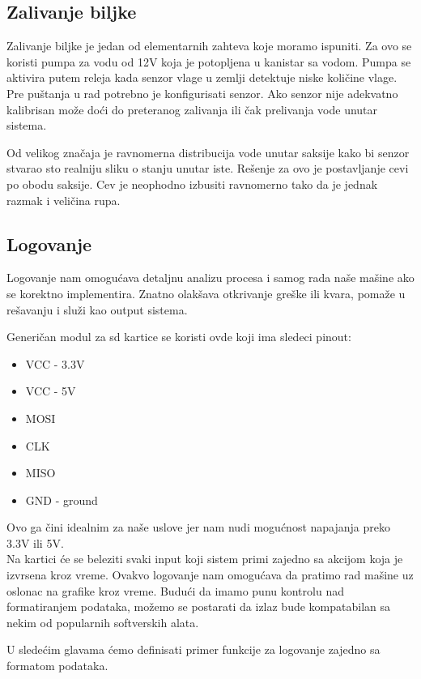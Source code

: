 \documentclass[a4paper,11pt]{book}
\begin{document}
\subsection{Zalivanje biljke}
Zalivanje biljke je jedan od elementarnih zahteva koje moramo ispuniti. Za ovo se koristi pumpa za vodu od 12V koja je potopljena u kanistar sa vodom. Pumpa se aktivira putem releja kada senzor vlage u zemlji detektuje niske količine vlage. Pre puštanja u rad potrebno je konfigurisati senzor. Ako senzor nije adekvatno kalibrisan može doći do preteranog zalivanja ili čak prelivanja vode unutar sistema.

\noindent Od velikog značaja je ravnomerna distribucija vode unutar saksije kako bi senzor stvarao sto realniju sliku o stanju unutar iste. Rešenje za ovo je postavljanje cevi po obodu saksije. Cev je neophodno izbusiti ravnomerno tako da je jednak razmak i veličina rupa.

\subsection{Logovanje}
Logovanje nam omogućava detaljnu analizu procesa i samog rada naše mašine ako se korektno implementira. Znatno olakšava otkrivanje greške ili kvara, pomaže u rešavanju i služi kao output sistema. 

Generičan modul za sd kartice se koristi ovde koji ima sledeci pinout:

\hrulefill
\begin{itemize}
  \item VCC - 3.3V
  \item VCC - 5V
  \item MOSI
  \item CLK 
  \item MISO
  \item GND - ground
\end{itemize}
\hrulefill

Ovo ga čini idealnim za naše uslove jer nam nudi mogućnost napajanja preko 3.3V ili 5V. \\

Na kartici će se beleziti svaki input koji sistem primi zajedno sa akcijom koja je izvrsena kroz vreme. Ovakvo logovanje nam omogućava da pratimo rad mašine uz oslonac na grafike kroz vreme. Budući da imamo punu kontrolu nad formatiranjem podataka, možemo se postarati da izlaz bude kompatabilan sa nekim od popularnih softverskih alata. 

U sledećim glavama ćemo definisati primer funkcije za logovanje zajedno sa formatom podataka.
\end{document}
